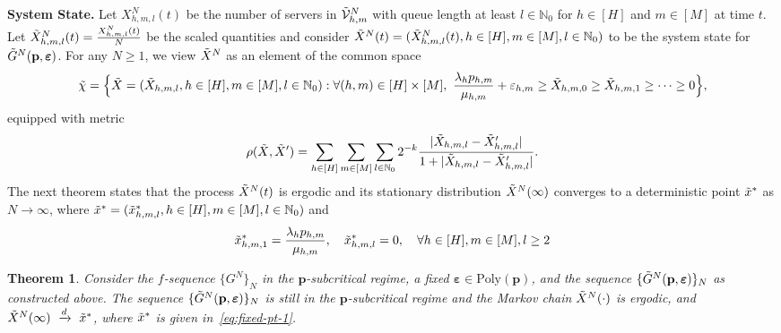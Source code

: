 \documentclass[11pt, reqno]{article}
\newtheorem{theorem}{Theorem}
\newtheorem{remark}[theorem]{Remark}
\numberwithin{equation}{section}
\numberwithin{theorem}{section}
\newcommand{\dto}{\ensuremath{\ \xrightarrow{d} \ }}  %
\newcommand{\N}{\mathbb{N}}                 %
\begin{document}
\noindent
\textbf{System State.}
Let $X^N_{h,m,l}(t)$ be the number of servers in $\Tilde{\mathcal{V}}^N_{h,m}$ with queue length at least $l\in \N_0$ for $h\in[H]$ and $m\in[M]$ at time $t$.  
Let $\Tilde{X}^N_{h,m,l}(t)=\frac{X^N_{h,m,l}(t)}{N}$ be the scaled quantities and consider 
$\Tilde{X}^N(t)=(\Tilde{X}^N_{h,m,l}(t),h\in[H],m\in[M],l\in\N_0)$ 
to be the system state for $\Tilde{G}^N(\mathbf{p},\boldsymbol\varepsilon)$. For any $N\geq 1$, we view $\Tilde{X}^N$ as an element of the common space 
\begin{equation*}
    \begin{split}
        \Tilde{\chi}=\Big\{\Tilde{X}=(\Tilde{X}_{h,m,l},h\in[H],m\in[M],l\in\N_0):\forall (h,m)\in[H]\times[M],\ 
        \frac{\lambda_hp_{h,m}}{\mu_{h,m}}+\varepsilon_{h,m}\geq\Tilde{X}_{h,m,0}\geq \Tilde{X}_{h,m,1}\geq\cdots\geq0\Big\},
    \end{split}
\end{equation*}
equipped with metric $$\rho(\Tilde{X},\Tilde{X}')=\sum_{h\in[H]}\sum_{m\in[M]}\sum_{l\in\N_0}2^{-k}\frac{|\Tilde{X}_{h,m,l}-\Tilde{X}_{h,m,l}'|}{1+|\Tilde{X}_{h,m,l}-\Tilde{X}_{h,m,l}'|}.$$
The next theorem states that the process $\Tilde{X}^N(t)$ is ergodic and its stationary distribution $\Tilde{X}^N(\infty)$ converges to a deterministic point $\Tilde{x}^*$ as $N\rightarrow\infty$, where $\Tilde{x}^*=(\Tilde{x}^*_{h,m,l},h\in[H],m\in[M],l\in\N_0)$ and 
\begin{equation}\label{eq:fixed-pt-1}
\Tilde{x}^*_{h,m,1}=\frac{\lambda_hp_{h,m}}{\mu_{h,m}}, \quad \Tilde{x}^*_{h,m,l}=0, \quad \forall h\in[H], m\in[M], l\geq 2
\end{equation}
\begin{theorem}\label{thm:fluid-limit-2}
Consider the $f$-sequence $\{G^N\}_{N}$ in the $\mathbf{p}$-subcritical regime, a fixed $\boldsymbol\varepsilon\in\mathrm{Poly}(\mathbf{p})$, and the sequence $\{\Tilde{G}^N(\mathbf{p},\boldsymbol\varepsilon)\}_{N}$ as constructed above. 
The sequence $\{\Tilde{G}^N(\mathbf{p},\boldsymbol\varepsilon)\}_{N}$ is still in the $\mathbf{p}$-subcritical regime and the Markov chain $\Tilde{X}^N(\cdot)$ is ergodic, and $\Tilde{X}^N(\infty)\dto\Tilde{x}^*$, where $\Tilde{x}^*$ is given in~\eqref{eq:fixed-pt-1}.
\end{theorem}
\end{document}
